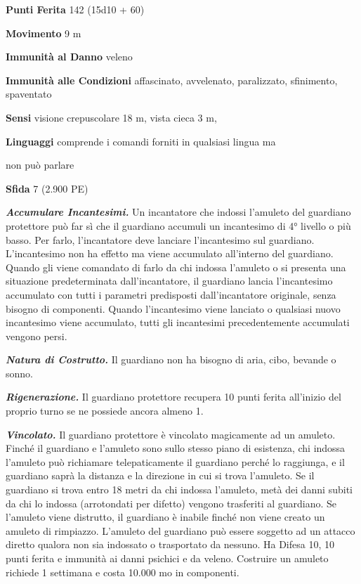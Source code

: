 \begin{multicols}{2}
\textbf{Punti Ferita} 142 (15d10 + 60)

\textbf{Movimento} 9 m

\textbf{Immunità al Danno} veleno

\textbf{Immunità alle Condizioni} affascinato, avvelenato, paralizzato,
sfinimento, spaventato

\textbf{Sensi} visione crepuscolare 18 m, vista cieca 3 m, 

\textbf{Linguaggi} comprende i comandi forniti in qualsiasi lingua ma

non può parlare

\textbf{Sfida} 7 (2.900 PE)

\emph{\textbf{Accumulare Incantesimi.}} Un incantatore che indossi
l'amuleto del guardiano protettore può far sì che il guardiano accumuli
un incantesimo di 4° livello o più basso. Per farlo, l'incantatore deve
lanciare l'incantesimo sul guardiano. L'incantesimo non ha effetto ma
viene accumulato all'interno del guardiano. Quando gli viene comandato
di farlo da chi indossa l'amuleto o si presenta una situazione
predeterminata dall'incantatore, il guardiano lancia l'incantesimo
accumulato con tutti i parametri predisposti dall'incantatore originale,
senza bisogno di componenti. Quando l'incantesimo viene lanciato o
qualsiasi nuovo incantesimo viene accumulato, tutti gli incantesimi
precedentemente accumulati vengono persi.

\emph{\textbf{Natura di Costrutto.}} Il guardiano non ha bisogno di
aria, cibo, bevande o sonno.

\emph{\textbf{Rigenerazione.}} Il guardiano protettore recupera 10 punti
ferita all'inizio del proprio turno se ne possiede ancora almeno 1.

\emph{\textbf{Vincolato.}} Il guardiano protettore è vincolato
magicamente ad un amuleto. Finché il guardiano e l'amuleto sono sullo
stesso piano di esistenza, chi indossa l'amuleto può richiamare
telepaticamente il guardiano perché lo raggiunga, e il guardiano saprà
la distanza e la direzione in cui si trova l'amuleto. Se il guardiano si
trova entro 18 metri da chi indossa l'amuleto, metà dei danni subiti da
chi lo indossa (arrotondati per difetto) vengono trasferiti al
guardiano. Se l'amuleto viene distrutto, il guardiano è inabile finché
non viene creato un amuleto di rimpiazzo. L'amuleto del guardiano può
essere soggetto ad un attacco diretto qualora non sia indossato o
trasportato da nessuno. Ha Difesa 10, 10 punti ferita e immunità ai danni
psichici e da veleno. Costruire un amuleto richiede 1 settimana e costa
10.000 mo in componenti.


\end{multicols}
